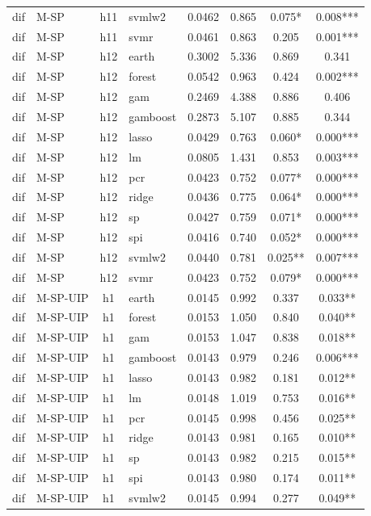 \begin{ThreePartTable}
\begin{longtable}[t]{llclcccc}
dif & M-SP & h11 & svmlw2 & 0.0462 & 0.865 & 0.075* & 0.008***\\
dif & M-SP & h11 & svmr & 0.0461 & 0.863 & 0.205 & 0.001***\\
\addlinespace
dif & M-SP & h12 & earth & 0.3002 & 5.336 & 0.869 & 0.341\\
dif & M-SP & h12 & forest & 0.0542 & 0.963 & 0.424 & 0.002***\\
dif & M-SP & h12 & gam & 0.2469 & 4.388 & 0.886 & 0.406\\
dif & M-SP & h12 & gamboost & 0.2873 & 5.107 & 0.885 & 0.344\\
dif & M-SP & h12 & lasso & 0.0429 & 0.763 & 0.060* & 0.000***\\
dif & M-SP & h12 & lm & 0.0805 & 1.431 & 0.853 & 0.003***\\
dif & M-SP & h12 & pcr & 0.0423 & 0.752 & 0.077* & 0.000***\\
dif & M-SP & h12 & ridge & 0.0436 & 0.775 & 0.064* & 0.000***\\
dif & M-SP & h12 & sp & 0.0427 & 0.759 & 0.071* & 0.000***\\
dif & M-SP & h12 & spi & 0.0416 & 0.740 & 0.052* & 0.000***\\
dif & M-SP & h12 & svmlw2 & 0.0440 & 0.781 & 0.025** & 0.007***\\
dif & M-SP & h12 & svmr & 0.0423 & 0.752 & 0.079* & 0.000***\\
\addlinespace
dif & M-SP-UIP & h1 & earth & 0.0145 & 0.992 & 0.337 & 0.033**\\
dif & M-SP-UIP & h1 & forest & 0.0153 & 1.050 & 0.840 & 0.040**\\
dif & M-SP-UIP & h1 & gam & 0.0153 & 1.047 & 0.838 & 0.018**\\
dif & M-SP-UIP & h1 & gamboost & 0.0143 & 0.979 & 0.246 & 0.006***\\
dif & M-SP-UIP & h1 & lasso & 0.0143 & 0.982 & 0.181 & 0.012**\\
dif & M-SP-UIP & h1 & lm & 0.0148 & 1.019 & 0.753 & 0.016**\\
dif & M-SP-UIP & h1 & pcr & 0.0145 & 0.998 & 0.456 & 0.025**\\
dif & M-SP-UIP & h1 & ridge & 0.0143 & 0.981 & 0.165 & 0.010**\\
dif & M-SP-UIP & h1 & sp & 0.0143 & 0.982 & 0.215 & 0.015**\\
dif & M-SP-UIP & h1 & spi & 0.0143 & 0.980 & 0.174 & 0.011**\\
dif & M-SP-UIP & h1 & svmlw2 & 0.0145 & 0.994 & 0.277 & 0.049**\\

\end{longtable}
\end{ThreePartTable}
